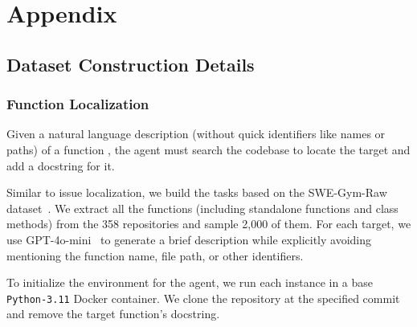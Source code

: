 \documentclass{article}
\theoremstyle{plain}
\theoremstyle{definition}
\theoremstyle{remark}
\begin{document}
\newpage
\appendix
\onecolumn
\section{Appendix}


\subsection{Dataset Construction Details}
\label{app:data-construction}

\subsubsection{Function Localization}

Given a natural language description (without quick identifiers like names or paths) of a function , the agent must search the codebase to locate the target and add a docstring for it.

Similar to issue localization, we build the tasks based on the SWE-Gym-Raw dataset~\citep{swegym}. 
We extract all the functions (including standalone functions and class methods) from the 358 repositories and sample 2,000 of them.
For each target, we use GPT-4o-mini~\cite{gpt4o_mini} to generate a brief description while explicitly avoiding mentioning the function name, file path, or other identifiers.

To initialize the environment for the agent, we run each instance in a base \texttt{Python-3.11} Docker container.
We clone the repository at the specified commit and remove the target function's docstring.
\end{document}
